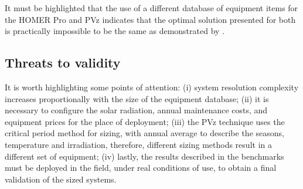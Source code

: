 \documentclass[review]{elsarticle}
\begin{document}
It must be highlighted that the use of a different database of equipment items for the HOMER Pro and PVz indicates that the optimal solution presented for both is practically impossible to be the same as demonstrated by \cite{Alsadi2018}. 

\subsection{Threats to validity} 

It is worth highlighting some points of attention: (i) system resolution complexity increases proportionally with the size of the equipment database; (ii) it is necessary to configure the solar radiation, annual maintenance costs, and equipment prices for the place of deployment; (iii) the PVz technique uses the critical period method for sizing, with annual average to describe the seasons, temperature and irradiation, therefore, different sizing methods result in a different set of equipment; (iv) lastly, the results described in the benchmarks must be deployed in the field, under real conditions of use, to obtain a final validation of the sized systems.
\end{document}
